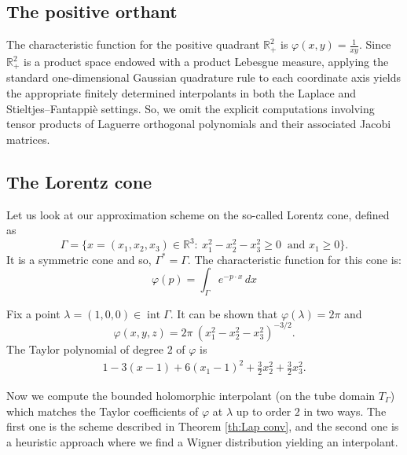 \documentclass[11pt,reqno]{amsart}
\theoremstyle{plain}
\theoremstyle{definition}
\numberwithin{equation}{section}
\begin{document}
\subsection{The positive orthant} 
The characteristic function for the positive quadrant $\mathbb{R}^2_+$ is $\varphi(x, y) = \frac{1}{xy}$. Since $\mathbb{R}^2_+$ is a product space endowed with a product Lebesgue measure, applying the standard one-dimensional Gaussian quadrature rule to each coordinate axis yields the appropriate finitely determined interpolants in both the Laplace and Stieltjes–Fantappi\`e settings. So, we omit the explicit computations involving tensor products of Laguerre orthogonal polynomials and their associated Jacobi matrices.

\subsection{The Lorentz cone}
Let us look at our approximation scheme on the so-called Lorentz cone, defined as
$$
\Gamma = \{x=(x_1, x_2, x_3)\in \mathbb{R}^3 : \ x_1^2 -x_2^2 -x_3^2 \geq 0 \ \text{ and } x_1 \geq 0 \}.
$$
It is a symmetric cone and so, $\Gamma^* = \Gamma$. The characteristic function for this cone is:
$$\varphi(p) = \int_\Gamma e^{- p \cdot x} \, dx$$

Fix a point $\lambda = (1, 0, 0) \in \operatorname{int} \Gamma$.
It can be shown that $\varphi(\lambda) =2\pi$ and 
$$\varphi(x, y, z) = 2\pi\ (x_1^2 - x_2^2 - x_3^2)^{-3/2}.$$
The Taylor polynomial of degree $2$ of $\varphi$ is 
\begin{align*}
   1 - 3(x-1) + 6(x_1-1)^2 + \frac{3}{2}x_2^2 + \frac{3}{2}x_3^2.
\end{align*}


Now we compute the bounded holomorphic interpolant (on the tube domain $T_\Gamma$) which matches the Taylor coefficients of $\varphi$ at $\lambda$ up to order $2$ in two ways. The first one is the scheme described in Theorem \ref{th:Lap conv}, and the second one is a heuristic approach where we find a Wigner distribution yielding an interpolant. 

\vspace{2mm}
\end{document}
